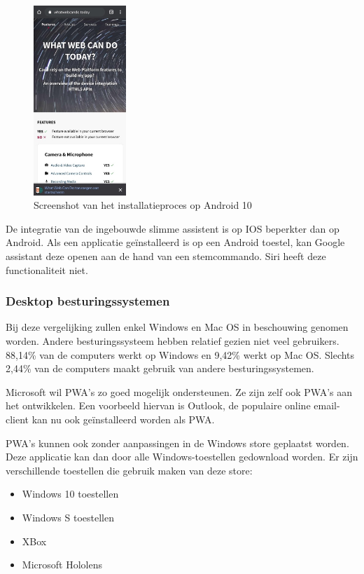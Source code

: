 \begin{figure}[H]
	\centering
	\includegraphics[width=35mm]{./img/installation_android.png}
	\caption{Screenshot van het installatieproces op Android 10}
\end{figure}


De integratie van de ingebouwde slimme assistent is op IOS beperkter dan op Android. Als een applicatie geïnstalleerd is op een Android toestel, kan Google assistant deze openen aan de hand van een stemcommando. Siri heeft deze functionaliteit niet.
\autocite{Lathiya2020}

\subsubsection{Desktop besturingssystemen}
Bij deze vergelijking zullen enkel Windows en Mac OS in beschouwing genomen worden. Andere besturingssysteem hebben relatief gezien niet veel gebruikers. 88,14\% van de computers werkt op Windows en 9,42\% werkt op Mac OS. Slechts 2,44\% van de computers maakt gebruik van andere besturingssystemen.
\autocite{netMarketShare2020}

Microsoft wil PWA’s zo goed mogelijk ondersteunen. Ze zijn zelf ook PWA’s aan het ontwikkelen. Een voorbeeld hiervan is Outlook, de populaire online email-client kan nu ook geïnstalleerd worden als PWA.
\autocite{Microsoft2020a}

PWA’s kunnen ook zonder aanpassingen in de Windows store geplaatst worden. Deze applicatie kan dan door alle Windows-toestellen gedownload worden. Er zijn verschillende toestellen die gebruik maken van deze store:
\begin{itemize}
	\item	Windows 10 toestellen
	\item	Windows S toestellen
	\item	XBox
	\item	Microsoft Hololens 
\end{itemize}

